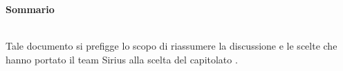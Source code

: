\noindent\begin{Large}\textbf{Sommario}\end{Large}\\

\noindent Tale documento si prefigge lo scopo di riassumere la discussione e le scelte che hanno portato il team Sirius alla scelta del capitolato \progetto.\\
